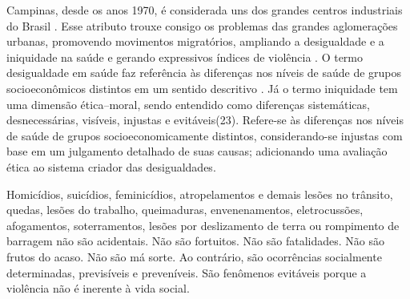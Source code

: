 Campinas, desde os anos 1970, é considerada uns dos grandes centros industriais do Brasil \citep{nascimento2016regiao}. Esse atributo trouxe consigo os problemas das grandes aglomerações urbanas, promovendo movimentos migratórios, ampliando a desigualdade e a iniquidade na saúde e gerando expressivos índices de violência \citep{aidar2003impacto, francisco2004distribuiccao}. O termo desigualdade em saúde faz referência às diferenças nos níveis de saúde de grupos socioeconômicos distintos em um sentido descritivo \citep{duarte2002epidemologia}. Já o termo iniquidade tem uma dimensão ética–moral, sendo entendido como diferenças sistemáticas, desnecessárias, visíveis, injustas e evitáveis(23). Refere-se às diferenças nos níveis de saúde de grupos socioeconomicamente distintos, considerando-se injustas com base em um julgamento detalhado de suas causas; adicionando uma avaliação ética ao sistema criador das desigualdades\citep{duarte2002epidemologia, nunes2001medindo}. 

Homicídios, suicídios, feminicídios, atropelamentos e demais lesões no trânsito, quedas, lesões do trabalho, queimaduras, envenenamentos, eletrocussões, afogamentos, soterramentos, lesões por deslizamento de terra ou rompimento de barragem não são acidentais. Não são fortuitos. Não são fatalidades. Não são frutos do acaso. Não são má sorte. Ao contrário, são ocorrências socialmente determinadas, previsíveis e preveníveis. São fenômenos evitáveis porque a violência não é inerente à vida social.

